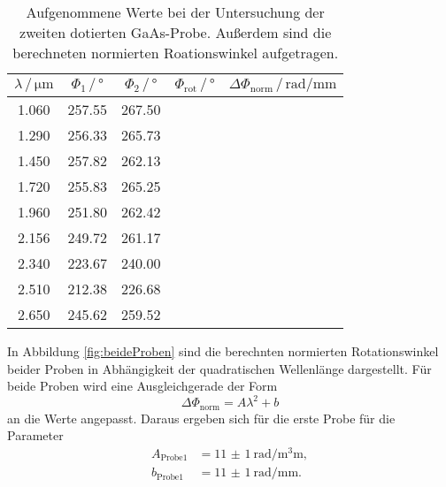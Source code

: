    \begin{table}[H]
    \centering
    \caption{Aufgenommene Werte bei der Untersuchung der zweiten dotierten GaAs-Probe. Außerdem sind die 
    berechneten normierten Roationswinkel aufgetragen.}
    \label{tab:tab:Probe2}
    \begin{tabular}{ccccc}
      \toprule
      $\lambda\, / \, \si{\micro\meter}$ & $\Phi_1 \, / \, \si{\degree}$ & $\Phi_2 \, / \, \si{\degree}$ & $\Phi_\text{rot} \, / \, \si{\degree}$ & $\Delta\Phi_\text{norm} \, / \, \si{\radian\per\milli\meter}$  \\
      \midrule
      1.060 & 257.55 & 267.50 &  &  \\
      1.290 & 256.33 & 265.73 &  &  \\
      1.450 & 257.82 & 262.13 &  &  \\
      1.720 & 255.83 & 265.25 &  &  \\
      1.960 & 251.80 & 262.42 &  &  \\
      2.156 & 249.72 & 261.17 &  &  \\
      2.340 & 223.67 & 240.00 &  &  \\
      2.510 & 212.38 & 226.68 &  &  \\
      2.650 & 245.62 & 259.52 &  &  \\
      \bottomrule
    \end{tabular}
   \end{table} \noindent
   In Abbildung \ref{fig:beideProben} sind die berechnten normierten Rotationswinkel beider Proben in
   Abhängigkeit der quadratischen Wellenlänge dargestellt.
   Für beide Proben wird eine Ausgleichgerade der 
   Form 
   \begin{equation}
       \Delta \Phi_\text{norm} = A \lambda^2 + b
   \end{equation} \noindent
   an die Werte angepasst. Daraus ergeben sich für die erste Probe für die Parameter
   \begin{align}
       A_\text{Probe1} &= \SI{11(1)}{\radian\per\cubic\milli\meter}, \\
        b_\text{Probe1} &= \SI{11(1)}{\radian\per\milli\meter}.
   \end{align} \noindent
